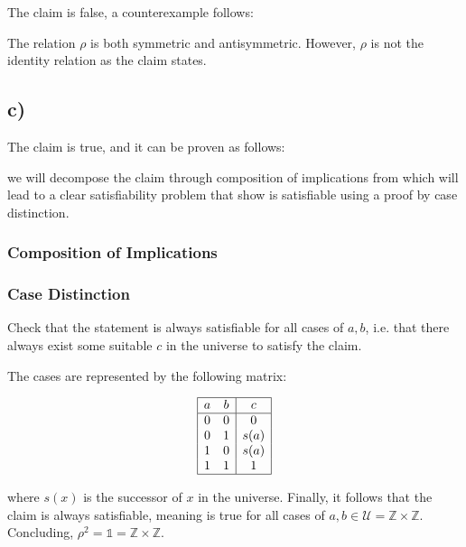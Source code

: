 \documentclass[unicode,11pt,a4paper,oneside,numbers=endperiod,openany]{scrartcl}
\newcommand{\myex}[3]{
    \ifthenelse{\equal{#1}{true}}{
        \begin{equation} \label{#2} \begin{aligned} #3 \end{aligned} \end{equation}
    }{
        \begin{equation*} \label{#2} \begin{aligned} #3 \end{aligned} \end{equation*}
    }
}
\begin{document}
The claim is false, a counterexample follows:

\myex{false}{ex5-5-b-counterexample}{
    \rho = \emptyset \neq \textsf{id}_A
}

The relation \( \rho \) is both symmetric and antisymmetric.
However, \( \rho \) is not the identity relation as the claim states.

\subsection*{c)}

The claim is true, and it can be proven as follows:

we will decompose the claim through composition of implications from which will lead
to a clear satisfiability problem that show is satisfiable using a proof by case distinction.

\subsubsection*{Composition of Implications}

\subsubsection*{Case Distinction}

Check that the statement is always satisfiable for all cases of \( a, b \),
i.e. that there always exist some suitable \( c \) in the universe to satisfy the claim.

The cases are represented by the following matrix:

\[
    \begin{array}{|cc|c|}
        \hline
        a & b & c \\
        \hline
        0 & 0 & 0    \\
        0 & 1 & s(a) \\
        1 & 0 & s(a) \\
        1 & 1 & 1    \\
        \hline
    \end{array}
\]

where \( s(x) \) is the successor of \( x \) in the universe.
Finally, it follows that the claim is always satisfiable, 
meaning is true for all cases of \( a, b \in \mathcal{U} = \mathbb{Z} \times \mathbb{Z} \).
Concluding, \( \rho^2 = \mathds{1} = \mathbb{Z} \times \mathbb{Z} \).
\end{document}

